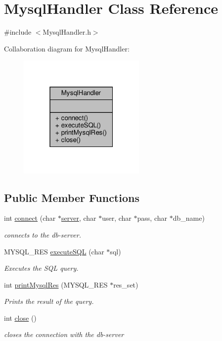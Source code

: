 \hypertarget{classMysqlHandler}{}\section{Mysql\+Handler Class Reference}
\label{classMysqlHandler}


{\ttfamily \#include $<$Mysql\+Handler.\+h$>$}



Collaboration diagram for Mysql\+Handler\+:\nopagebreak
\begin{figure}[H]
\begin{center}
\leavevmode
\includegraphics[width=175pt]{classMysqlHandler__coll__graph}
\end{center}
\end{figure}
\subsection*{Public Member Functions}
\begin{DoxyCompactItemize}
\item 
int \hyperlink{classMysqlHandler_acd74d4ee6a2853d07218cd7a300ee6d2}{connect} (char $\ast$\hyperlink{main_8h_afd1a82c786509e03b540bae82af2c137}{server}, char $\ast$user, char $\ast$pass, char $\ast$db\+\_\+name)
\begin{DoxyCompactList}\small\item\em connects to the db-\/server. \end{DoxyCompactList}\item 
M\+Y\+S\+Q\+L\+\_\+\+R\+ES \hyperlink{classMysqlHandler_abee4d47196df8c42420fe771508a6ff9}{execute\+S\+QL} (char $\ast$sql)
\begin{DoxyCompactList}\small\item\em Executes the S\+QL query. \end{DoxyCompactList}\item 
int \hyperlink{classMysqlHandler_affb80fba704894dca83d563f6582edc0}{print\+Mysql\+Res} (M\+Y\+S\+Q\+L\+\_\+\+R\+ES $\ast$res\+\_\+set)
\begin{DoxyCompactList}\small\item\em Prints the result of the query. \end{DoxyCompactList}\item 
int \hyperlink{classMysqlHandler_aef277d872eb51db9ce2fe66fed348941}{close} ()
\begin{DoxyCompactList}\small\item\em closes the connection with the db-\/server \end{DoxyCompactList}\end{DoxyCompactItemize}


